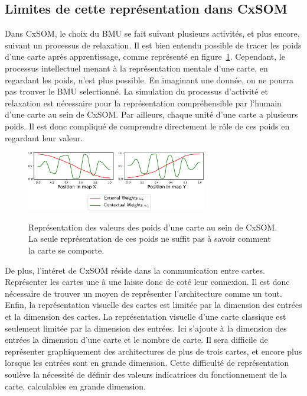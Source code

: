 \subsection{Limites de cette représentation dans CxSOM}

Dans CxSOM, le choix du BMU se fait suivant plusieurs activités, et plus encore, suivant un processus de relaxation. Il est bien entendu possible de tracer les poids d'une carte après apprentissage, comme représenté en figure~\ref{fig:weights}. Cependant, le processus intellectuel menant à la représentation mentale d'une carte, en regardant les poids, n'est plus possible. En imaginant une donnée, on ne pourra pas trouver le BMU selectionné. La simulation du processus d'activité et relaxation est nécessaire pour la représentation compréhensible par l'humain d'une carte au sein de CxSOM. Par ailleurs, chaque unité d'une carte a plusieurs poids. Il est donc compliqué de comprendre directement le rôle de ces poids en regardant leur valeur.
\begin{figure}
\centering
\includegraphics[width=0.7\textwidth]{weights_2.pdf}
\label{fig:weights}
\caption{Représentation des valeurs des poids d'une carte au sein de CxSOM. La seule représentation de ces poids ne suffit pas à savoir comment la carte se comporte. }
\end{figure}

De plus, l'intéret de CxSOM réside dans la communication entre cartes. Représenter les cartes une à une laisse donc de coté leur connexion. Il est donc nécessaire de trouver un moyen de représenter l'architecture comme un tout.
Enfin, la représentation visuelle des cartes est limitée par la dimension des entrées et la dimension des cartes. La représentation visuelle d'une carte classique est seulement limitée par la dimension des entrées. Ici s'ajoute à la dimension des entrées la dimension d'une carte et le nombre de carte. Il sera difficile de représenter graphiquement des architectures de plus de trois cartes, et encore plus lorsque les entrées sont en grande dimension. Cette difficulté de représentation soulève la nécessité de définir des valeurs indicatrices du fonctionnement de la carte, calculables en grande dimension.

